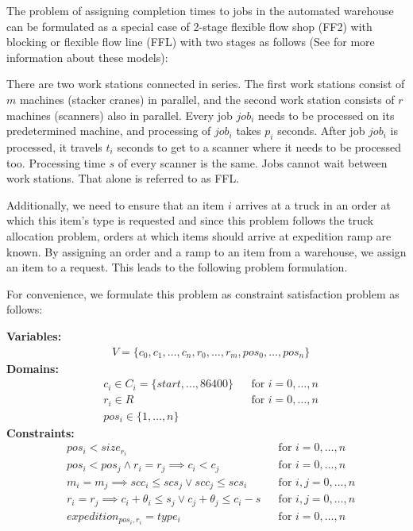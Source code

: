 \documentclass{ctuthesis}
\begin{document}
The problem of assigning completion times to jobs in the automated warehouse can be formulated as a special case of 2-stage flexible flow shop (FF2) with blocking or flexible flow line (FFL) with two stages as follows (See \cite{pinedo} for more information about these models):

There are two work stations connected in series. The first work stations consist of $m$ machines (stacker cranes) in parallel, and the second work station consists of $r$ machines (scanners) also in parallel. Every job $job_i$ needs to be processed on its predetermined machine, and processing of $job_i$ takes $p_i$ seconds. After job $job_i$ is processed, it travels $t_i$ seconds to get to a scanner where it needs to be processed too. Processing time $s$ of every scanner is the same. Jobs cannot wait between work stations. That alone is referred to as FFL.

Additionally, we need to ensure that an item $i$ arrives at a truck in an order at which this item's type is requested and since this problem follows the truck allocation problem, orders at which items should arrive at expedition ramp are known. By assigning an order and a ramp to an item from a warehouse, we assign an item to a request. This leads to the following problem formulation.

For convenience, we formulate this problem as constraint satisfaction problem as follows:

\textbf{Variables:}
\begin{align}
    &V = \{c_{0}, c_{1}, \ldots, c_{n},r_0, \ldots, r_m, pos_0, \ldots, pos_n\}
\end{align}
\textbf{Domains:}
\begin{align}
&c_{i} \in C_i = \{start, ..., 86400\} && \text{for } i=0,\ldots,n\\
&r_{i} \in R && \text{for } i=0,\ldots,n\\
&pos_i \in \{1, \ldots, n\}
\end{align}
\textbf{Constraints:}
 \begin{align}
& pos_i < size_{r_i} && \text{for } i=0,\ldots,n \nonumber \\
& pos_i < pos_j \land r_i = r_j \implies c_i < c_j && \text{for } i=0,\ldots,n\\ \label{eq:idcons2}
& m_i = m_j \implies scc_i \leq scs_j \lor scc_j \leq scs_i && \text{for } i,j=0,\ldots,n\\ \label{eq:idcons1}
& r_i = r_j \implies c_i  + \theta_i \leq s_j \lor c_j + \theta_j \leq c_i - s && \text{for } i,j=0,\ldots,n\\ \label{eq:idcons4}
& expedition_{pos_i,r_i} = type_i  && \text{for } i=0,\ldots,n\\ \label{eq:idcons3}
\end{align}
\end{document}
